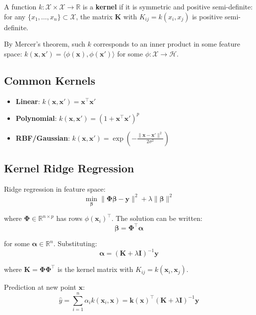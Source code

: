 \documentclass[main.tex]{subfiles}
\begin{document}
\begin{definition}[Kernel]
A function $k: \mathcal{X} \times \mathcal{X} \to \mathbb{R}$ is a \textbf{kernel} if it is symmetric and positive semi-definite: for any $\{x_1, \ldots, x_n\} \subset \mathcal{X}$, the matrix $\mathbf{K}$ with $K_{ij} = k(x_i, x_j)$ is positive semi-definite.
\end{definition}

By Mercer's theorem, such $k$ corresponds to an inner product in some feature space: $k(\mathbf{x}, \mathbf{x}') = \langle\phi(\mathbf{x}), \phi(\mathbf{x}')\rangle$ for some $\phi: \mathcal{X} \to \mathcal{H}$.

\subsection{Common Kernels}

\begin{itemize}
    \item \textbf{Linear}: $k(\mathbf{x}, \mathbf{x}') = \mathbf{x}^\top\mathbf{x}'$
    \item \textbf{Polynomial}: $k(\mathbf{x}, \mathbf{x}') = (1 + \mathbf{x}^\top\mathbf{x}')^p$
    \item \textbf{RBF/Gaussian}: $k(\mathbf{x}, \mathbf{x}') = \exp\left(-\frac{\|\mathbf{x} - \mathbf{x}'\|^2}{2\sigma^2}\right)$
\end{itemize}

\subsection{Kernel Ridge Regression}

Ridge regression in feature space:
$$\min_{\boldsymbol{\beta}} \|\boldsymbol{\Phi}\boldsymbol{\beta} - \mathbf{y}\|^2 + \lambda\|\boldsymbol{\beta}\|^2$$

where $\boldsymbol{\Phi} \in \mathbb{R}^{n \times p}$ has rows $\phi(\mathbf{x}_i)^\top$. The solution can be written:
$$\boldsymbol{\beta} = \boldsymbol{\Phi}^\top\boldsymbol{\alpha}$$

for some $\boldsymbol{\alpha} \in \mathbb{R}^n$. Substituting:
$$\boldsymbol{\alpha} = (\mathbf{K} + \lambda\mathbf{I})^{-1}\mathbf{y}$$

where $\mathbf{K} = \boldsymbol{\Phi}\boldsymbol{\Phi}^\top$ is the kernel matrix with $K_{ij} = k(\mathbf{x}_i, \mathbf{x}_j)$.

Prediction at new point $\mathbf{x}$:
$$\hat{y} = \sum_{i=1}^{n}\alpha_i k(\mathbf{x}_i, \mathbf{x}) = \mathbf{k}(\mathbf{x})^\top(\mathbf{K} + \lambda\mathbf{I})^{-1}\mathbf{y}$$
\end{document}
